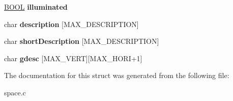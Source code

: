 \begin{DoxyCompactItemize}
\hyperlink{types_8h_a3e5b8192e7d9ffaf3542f1210aec18dd}{B\+O\+OL} {\bfseries illuminated}
\item 
\mbox{\label{struct__Space_ab7f0a3fe1e51498c8544f8dba829f140}} 
char {\bfseries description} \mbox{[}M\+A\+X\+\_\+\+D\+E\+S\+C\+R\+I\+P\+T\+I\+ON\mbox{]}
\item 
\mbox{\label{struct__Space_a1330dfa24bb57a7c3f4e9f594d5fa0d3}} 
char {\bfseries short\+Description} \mbox{[}M\+A\+X\+\_\+\+D\+E\+S\+C\+R\+I\+P\+T\+I\+ON\mbox{]}
\item 
\mbox{\label{struct__Space_aafe695feb45c69453eaf4fb514c9b39f}} 
char {\bfseries gdesc} \mbox{[}M\+A\+X\+\_\+\+V\+E\+RT\mbox{]}\mbox{[}M\+A\+X\+\_\+\+H\+O\+RI+1\mbox{]}
\end{DoxyCompactItemize}


The documentation for this struct was generated from the following file\+:\begin{DoxyCompactItemize}
\item 
space.\+c\end{DoxyCompactItemize}
